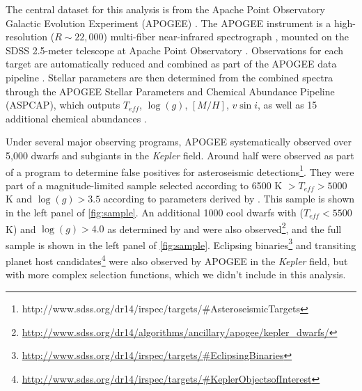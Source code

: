 \documentclass[manuscript]{aastex6}
\newcommand{\vsini}{\ensuremath{v \sin i}}
\newcommand{\Kepler}{\mbox{\textit{Kepler}}}
\newcommand{\Teff}{\ensuremath{T_{eff}}}
\newcommand{\logg}{\ensuremath{\log(g)}}
\newcommand{\kms}{\textrm{~km~s}\ensuremath{^{-1}}}
\begin{document}
\begin{figure*}
    \caption{\emph{Left:} Stellar properties of the full APOKASC 
    asteroseismic dwarf/subgiant control sample. The black points mark
    spectroscopic \logg{}s for the full control sample. For the
    subsampleshowing oscillations, asteroseismically-derived \logg{}s are 
    marked as green stars, while spectroscopically-derived \logg{}s are 
    marked as orange circles. 
    \emph{Right:} The full cool dwarf sample as measured with APOGEE stellar 
    parameters. Stars with \(\logg < 3.0\) are classified as giants, and are 
    labeled as pink circles. Subgiants and dwarfs are separated by the shown 
    dividing line, with subgiants as purple circles and dwarfs as red circles. 
    Rapid rotators with \(\vsini > 12 \kms\) are denoted with dark blue stars, 
    while stars with marginally detected rotation \(7 \kms < \vsini < 12 
    \kms\) are denoted with light blue stars. The dotted vertical line 
    indicates the \(\Teff = 5450\) K boundary.\label{fig:sample}}
\end{figure*}

The central dataset for this analysis is from the Apache Point Observatory 
Galactic Evolution Experiment (APOGEE) \citep{Blanton17,Majewski17}. The
APOGEE instrument is a high-resolution (\(R \sim 22,000\)) multi-fiber 
near-infrared spectrograph \citep{Wilson10}, mounted on the SDSS 2.5-meter 
telescope at Apache Point Observatory \citep{Gunn06}. Observations for each
target are automatically reduced and combined as part of the APOGEE data 
pipeline \citep{Nidever15}. Stellar parameters are then determined from the 
combined spectra through the APOGEE Stellar Parameters and Chemical Abundance 
Pipeline (ASPCAP), which outputs \Teff{}, \logg{}, \([M/H]\), \vsini{}, as 
well as 15 additional chemical abundances \citep{GarciaPerez16}.

Under several major observing programs, APOGEE systematically observed over 
5,000 dwarfs and subgiants in the \Kepler{} field. Around half were
observed as part of a program to determine false positives for
asteroseismic
detections\footnote{http://www.sdss.org/dr14/irspec/targets/#AsteroseismicTargets}. 
They were part of a magnitude-limited sample
selected according to 6500 K \(> \Teff > 5000\) K and \(\logg > 3.5\)
according to parameters derived by \citet{Huber14} \citep{Zasowski17}.
This sample is shown in the left panel of \cref{fig:sample}. An additional 
1000 cool dwarfs with (\(\Teff < 5500\) K) and \(\logg > 4.0\) as determined
by \citet{Pinsonneault12} and \citet{Brown11} were also 
observed\footnote{\url{http://www.sdss.org/dr14/algorithms/ancillary/apogee/kepler_dwarfs/}}, 
and the full sample is shown in the left panel of \cref{fig:sample}. 
Eclipsing
binaries\footnote{\url{http://www.sdss.org/dr14/irspec/targets/#EclipsingBinaries}} 
and transiting planet host 
candidates\footnote{\url{http://www.sdss.org/dr14/irspec/targets/#KeplerObjectsofInterest}} 
were also observed 
by APOGEE in the \Kepler{} field, but with more complex selection functions, 
which we didn't include in this analysis.
\end{document}
